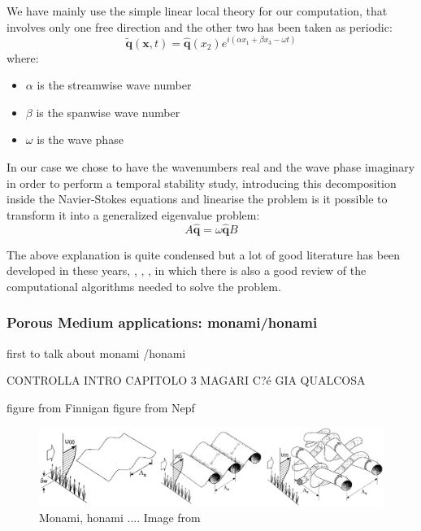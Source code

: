 We have mainly use the simple linear local theory for our computation, that involves only one free direction and the other two has been taken as periodic:
$$  \widetilde{\mathbf{q}}(\mathbf{x},t) =  \widehat{\mathbf{q}}(x_2) e^{i(\alpha x_1 + \beta x_3 - \omega t)}  $$ 
where:
\begin{itemize}
	\item $\alpha$ is the streamwise wave number
	\item $\beta$ is the spanwise wave number
	\item $\omega$ is the wave phase
\end{itemize}

In our case we chose to have the wavenumbers real and the wave phase imaginary in order to perform a temporal stability study, introducing this decomposition inside the Navier-Stokes equations and linearise the problem is it possible to transform it into a generalized eigenvalue problem:
$$ A \widehat{\mathbf{q}}=  \omega \widehat{\mathbf{q}}B $$   

The above explanation is quite condensed but a lot of good literature has been developed in these years, \cite{juniper2014modal}, \cite{criminale2003theory}, \cite{schmid2012stability}, in which there is also a good review of the computational algorithms needed to solve the problem.

\subsubsection{Porous Medium applications: monami/honami}

\citet{inoue1955studies} first to talk about monami /honami

CONTROLLA INTRO CAPITOLO 3 MAGARI C?é GIA QUALCOSA
\citet{pluvinage2014instabilities}
\citet{py2006frequency}
\citet{singh2016linear}

figure from Finnigan
figure from Nepf


\begin{figure}[h]
	\centering
	\includegraphics[width=1\linewidth]{chapter_1/finn}
	\caption{Monami, honami .... Image from \citet{finnigan2000turbulence}}
	\label{fig:monai_evol}
\end{figure}


